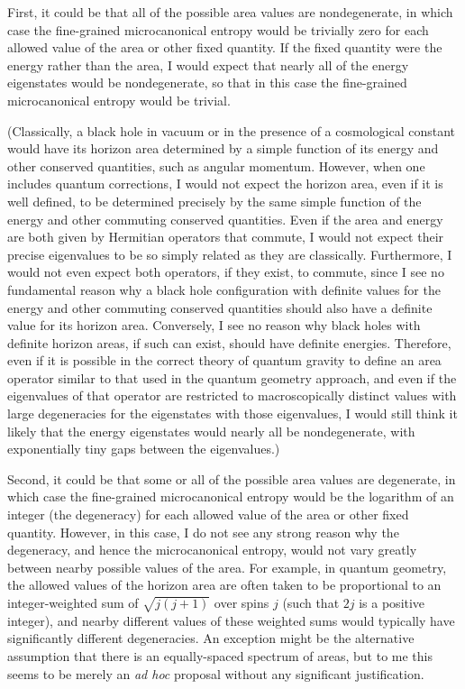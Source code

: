 \documentclass[12pt]{article} \usepackage{latexsym}
\begin{document}
First, it could be that all of the possible area values are
nondegenerate, in which case the fine-grained microcanonical entropy
would be trivially zero for each allowed value of the area or other
fixed quantity.  If the fixed quantity were the energy rather than the
area, I would expect that nearly all of the energy eigenstates would be
nondegenerate, so that in this case the fine-grained microcanonical
entropy would be trivial.

(Classically, a black hole in vacuum or in the presence of a
cosmological constant would have its horizon area determined by a
simple function of its energy and other conserved quantities, such as
angular momentum.  However, when one includes quantum corrections, I
would not expect the horizon area, even if it is well defined, to be
determined precisely by the same simple function of the energy and
other commuting conserved quantities.  Even if the area and energy are
both given by Hermitian operators that commute, I would not expect
their precise eigenvalues to be so simply related as they are
classically.  Furthermore, I would not even expect both operators, if
they exist, to commute, since I see no fundamental reason why a black
hole configuration with definite values for the energy and other
commuting conserved quantities should also have a definite value for
its horizon area.  Conversely, I see no reason why black holes with
definite horizon areas, if such can exist, should have definite
energies.  Therefore, even if it is possible in the correct theory of
quantum gravity to define an area operator similar to that used in the
quantum geometry approach, and even if the eigenvalues of that operator
are restricted to macroscopically distinct values with large
degeneracies for the eigenstates with those eigenvalues, I would still
think it likely that the energy eigenstates would nearly all be
nondegenerate, with exponentially tiny gaps between the eigenvalues.)

Second, it could be that some or all of the possible area values are
degenerate, in which case the fine-grained microcanonical entropy would
be the logarithm of an integer (the degeneracy) for each allowed value
of the area or other fixed quantity.  However, in this case, I do not
see any strong reason why the degeneracy, and hence the microcanonical
entropy, would not vary greatly between nearby possible values of the
area.  For example, in quantum geometry, the allowed values of the
horizon area are often taken to be proportional to an integer-weighted
sum of $\sqrt{j(j+1)}$ over spins $j$ (such that $2j$ is a positive
integer), and nearby different values of these weighted sums would
typically have significantly different degeneracies.  An exception
might be the alternative assumption that there is an equally-spaced
spectrum of areas, but to me this seems to be merely an {\it ad hoc}
proposal without any significant justification.
\end{document}
